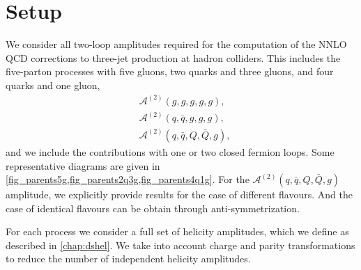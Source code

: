\section{Setup}
\label{5parton:sec:amplitudes}

We consider all
two-loop amplitudes required for the computation of the NNLO QCD corrections to three-jet production at
hadron colliders.
This includes the
five-parton processes with five gluons, two quarks and three gluons, and four
quarks and one gluon,  
\begin{align*}
  &\mathcal{A}^{(2)}(g,g,g,g,g), \\
  &\mathcal{A}^{(2)}(q,\bar{q},g,g,g), \\
  &\mathcal{A}^{(2)}(q,\bar{q},Q,\bar{Q},g),
\end{align*}
and we include the contributions with one or two closed fermion loops.
Some representative diagrams are given in \cref{fig_parents5g,fig_parents2q3g,fig_parents4q1g}.
For the $\mathcal{A}^{(2)}(q,\bar{q},Q,\bar{Q},g)$ amplitude, we explicitly provide results for the case 
of different flavours. And the case of identical flavours can be obtain through anti-symmetrization.

For each process we consider a full set of helicity amplitudes, which we 
define as described in \cref{chap:dshel}.
We take into account charge and parity transformations to reduce
the number of independent helicity amplitudes.

